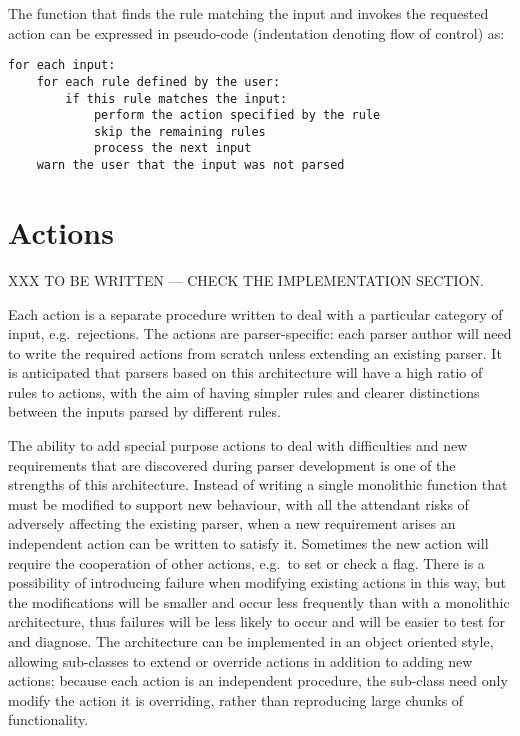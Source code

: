 The function that finds the rule matching the input and invokes the
requested action can be expressed in pseudo-code (indentation denoting flow
of control) as:


\begin{verbatim}
for each input:
    for each rule defined by the user: 
        if this rule matches the input:
            perform the action specified by the rule
            skip the remaining rules
            process the next input
    warn the user that the input was not parsed
\end{verbatim}

\section{Actions}

\label{actions in architecture}

XXX TO BE WRITTEN --- CHECK THE IMPLEMENTATION SECTION\@.

Each action is a separate procedure written to deal with a particular
category of input, e.g.\ rejections.  The actions are parser-specific: each
parser author will need to write the required actions from scratch unless
extending an existing parser.  It is anticipated that parsers based on this
architecture will have a high ratio of rules to actions, with the aim of
having simpler rules and clearer distinctions between the inputs parsed by
different rules.  

The ability to add special purpose actions to deal with difficulties and
new requirements that are discovered during parser development is one of
the strengths of this architecture.  Instead of writing a single monolithic
function that must be modified to support new behaviour, with all the
attendant risks of adversely affecting the existing parser, when a new
requirement arises an independent action can be written to satisfy it.
Sometimes the new action will require the cooperation of other actions,
e.g.\ to set or check a flag.  There is a possibility of introducing
failure when modifying existing actions in this way, but the modifications
will be smaller and occur less frequently than with a monolithic
architecture, thus failures will be less likely to occur and will be easier
to test for and diagnose.  The architecture can be implemented in an object
oriented style, allowing sub-classes to extend or override actions in
addition to adding new actions; because each action is an independent
procedure, the sub-class need only modify the action it is overriding,
rather than reproducing large chunks of functionality.


